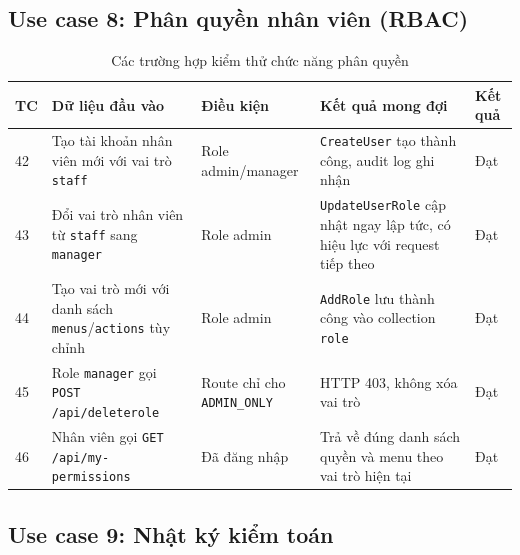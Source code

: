 \documentclass[../DoAn.tex]{subfiles}
\begin{document}
\subsection*{Use case 8: Phân quyền nhân viên (RBAC)}

\begin{table}[H]
\centering
\caption{Các trường hợp kiểm thử chức năng phân quyền}
\label{tab:test-rbac}
\scriptsize
\begin{tabular}{|p{0.5cm}|p{3.5cm}|p{3cm}|p{3.5cm}|p{2cm}|}
\hline
\textbf{TC} & \textbf{Dữ liệu đầu vào} & \textbf{Điều kiện} & \textbf{Kết quả mong đợi} & \textbf{Kết quả} \\
\hline
42 & Tạo tài khoản nhân viên mới với vai trò \texttt{staff} & Role admin/manager & \texttt{CreateUser} tạo thành công, audit log ghi nhận & Đạt \\
\hline
43 & Đổi vai trò nhân viên từ \texttt{staff} sang \texttt{manager} & Role admin & \texttt{UpdateUserRole} cập nhật ngay lập tức, có hiệu lực với request tiếp theo & Đạt \\
\hline
44 & Tạo vai trò mới với danh sách \texttt{menus}/\texttt{actions} tùy chỉnh & Role admin & \texttt{AddRole} lưu thành công vào collection \texttt{role} & Đạt \\
\hline
45 & Role \texttt{manager} gọi \texttt{POST /api/deleterole} & Route chỉ cho \break \texttt{ADMIN\_ONLY} & HTTP 403, không xóa vai trò & Đạt \\
\hline
46 & Nhân viên gọi \texttt{GET /api/my-permissions} & Đã đăng nhập & Trả về đúng danh sách quyền và menu theo vai trò hiện tại & Đạt \\
\hline
\end{tabular}
\end{table}

\subsection*{Use case 9: Nhật ký kiểm toán}
\end{document}
